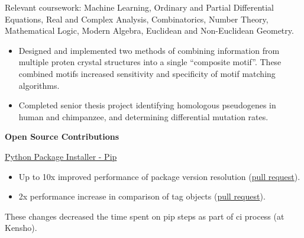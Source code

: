 Relevant coursework: Machine Learning, Ordinary and Partial Differential Equations, Real and Complex Analysis, Combinatorics, Number Theory, Mathematical Logic, Modern Algebra, Euclidean and Non-Euclidean Geometry.
\begin{itemize}[topsep=1ex, partopsep=0ex, parsep=0ex, itemsep=0.4ex]
    \item Designed and implemented two methods of combining information from multiple proten crystal structures into a single ``composite motif''. These combined motifs increased sensitivity and specificity of motif matching algorithms.
    \item Completed senior thesis project identifying homologous pseudogenes in human and chimpanzee, and determining differential mutation rates.
\end{itemize}

\hrulefill
\vspace{\littleskip}

\myfontsize{\bigheader}
\textbf{Open Source Contributions}
\myfontsize{\bodysize}\\


\vspace{\littleskip}
\vspace{\littleskip}

\myfontsize{\littleheader}
\href{https://github.com/pypa/pip}{Python Package Installer - Pip}\\
\myfontsize{\bodysize}

\begin{itemize}[topsep=1ex, partopsep=0ex, parsep=0ex, itemsep=0.4ex]
    \item Up to 10x improved performance of package version resolution (\href{https://github.com/pypa/pip/pull/9748}{pull request}).
    \item 2x performance increase in comparison of tag objects (\href{https://github.com/pypa/packaging/pull/417}{pull request}).
\end{itemize}
These changes decreased the time spent on pip steps as part of ci process (at Kensho).

\vspace{\littleskip}
\vspace{\littleskip}


